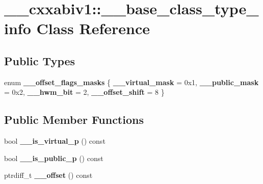 \hypertarget{class____cxxabiv1_1_1____base__class__type__info}{\section{\+\_\+\+\_\+cxxabiv1\+:\+:\+\_\+\+\_\+base\+\_\+class\+\_\+type\+\_\+info Class Reference}
\label{class____cxxabiv1_1_1____base__class__type__info}
}
\subsection*{Public Types}
\begin{DoxyCompactItemize}
\item 
\hypertarget{class____cxxabiv1_1_1____base__class__type__info_a7675c47e3b7628a30a78c16332ad1918}{enum {\bfseries \+\_\+\+\_\+offset\+\_\+flags\+\_\+masks} \{ {\bfseries \+\_\+\+\_\+virtual\+\_\+mask} = 0x1, 
{\bfseries \+\_\+\+\_\+public\+\_\+mask} = 0x2, 
{\bfseries \+\_\+\+\_\+hwm\+\_\+bit} = 2, 
{\bfseries \+\_\+\+\_\+offset\+\_\+shift} = 8
 \}}\label{class____cxxabiv1_1_1____base__class__type__info_a7675c47e3b7628a30a78c16332ad1918}

\end{DoxyCompactItemize}
\subsection*{Public Member Functions}
\begin{DoxyCompactItemize}
\item 
\hypertarget{class____cxxabiv1_1_1____base__class__type__info_a7546bd046c281668a4ac9bdce88f06c5}{bool {\bfseries \+\_\+\+\_\+is\+\_\+virtual\+\_\+p} () const }\label{class____cxxabiv1_1_1____base__class__type__info_a7546bd046c281668a4ac9bdce88f06c5}

\item 
\hypertarget{class____cxxabiv1_1_1____base__class__type__info_aec2664fa7ae89325260950c69932fd41}{bool {\bfseries \+\_\+\+\_\+is\+\_\+public\+\_\+p} () const }\label{class____cxxabiv1_1_1____base__class__type__info_aec2664fa7ae89325260950c69932fd41}

\item 
\hypertarget{class____cxxabiv1_1_1____base__class__type__info_a864fbb611f3aed4c042ef96007c512d9}{ptrdiff\+\_\+t {\bfseries \+\_\+\+\_\+offset} () const }\label{class____cxxabiv1_1_1____base__class__type__info_a864fbb611f3aed4c042ef96007c512d9}

\end{DoxyCompactItemize}
